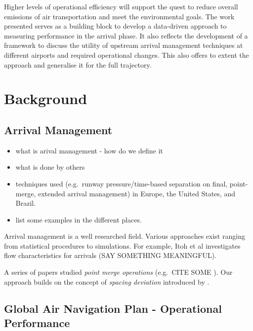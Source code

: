 \documentclass[
  journal,
]{IEEEtran}%
\providecommand{\tightlist}{%
  \setlength{\itemsep}{0pt}\setlength{\parskip}{0pt}}\usepackage{longtable,booktabs,array}
\begin{document}
Higher levels of operational efficiency will support the quest to reduce
overall emissions of air transportation and meet the environmental
goals. The work presented serves as a building block to develop a
data-driven approach to measuring performance in the arrival phase. It
also reflects the development of a framework to discuss the utility of
upstream arrival management techniques at different airports and
required operational changes. This also offers to extent the approach
and generalise it for the full trajectory.

\section{Background}\label{background}

\subsection{Arrival Management}\label{arrival-management}

\begin{itemize}
\tightlist
\item
  what is arival management - how do we define it
\item
  what is done by others
\item
  techniques used (e.g.~runway pressure/time-based separation on final,
  point-merge, extended arrival management) in Europe, the United
  States, and Brazil.
\item
  list some examples in the different places.
\end{itemize}

Arrival management is a well researched field. Various approaches exist
ranging from statistical procedures to simulations. For example, Itoh et
al  investigates flow
characteristics for arrivals (SAY SOMETHING MEANINGFUL).

A series of papers studied \emph{point merge operations} (e.g.~CITE SOME
). Our approach builds on the
concept of \emph{spacing deviation} introduced by
.

\subsection{Global Air Navigation Plan - Operational
Performance}\label{global-air-navigation-plan---operational-performance}
\end{document}
